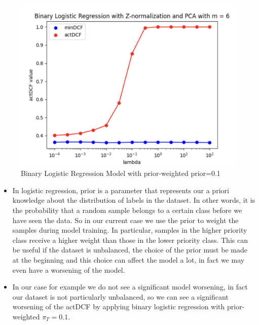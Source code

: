 \documentclass{article}
\begin{document}
\begin{figure}[H]
\begin{minipage}{.23\textwidth}
            \includegraphics[width=\linewidth]{./img/LLR_Z3.png}
        \end{minipage}
        \caption{Binary Logistic Regression Model with prior-weighted prior=0.1} %
        \label{fig:LLR_model_W} %
    \end{figure}


\begin{itemize}
    \item In logistic regression, prior is a parameter that represents our a priori knowledge about the distribution of labels in the dataset. 
In other words, it is the probability that a random sample belongs to a certain class before we have seen the data.  
So in our current case we use the prior to weight the samples during model training. In particular, samples in the higher priority class receive a higher weight than those in the lower priority class. 
This can be useful if the dataset is unbalanced, the choice of the prior must be made at the beginning and this choice can affect the model a lot, in fact we may even have a worsening of the model. 
\item In our case for example we do not see a significant model worsening, in fact our dataset is not particularly unbalanced, so we can see a significant worsening of the actDCF by applying binary logistic regression with prior-weighted \(\pi_T=0.1\).
\end{itemize}
\end{document}
